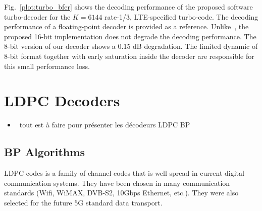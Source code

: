 Fig.~\ref{plot:turbo_bfer} shows the decoding performance of the proposed
software turbo-decoder for the $K = 6144$ rate-1/3, LTE-specified turbo-code.
The decoding performance of a floating-point decoder is provided as a reference.
Unlike~\cite{Wu2013}, the proposed 16-bit implementation does not degrade the
decoding performance. The 8-bit version of our decoder shows a 0.15 dB
degradation. The limited dynamic of 8-bit format together with early saturation
inside the decoder are responsible for this small performance loss.

\section{LDPC Decoders}

\begin{itemize}
  \item \xmark~tout est à faire pour présenter les décodeurs LDPC BP
\end{itemize}

\subsection{BP Algorithms}

LDPC codes is a family of channel codes that is well spread in current digital
communication systems. They have been chosen in many communication standards
(Wifi, WiMAX, DVB-S2, 10Gbps Ethernet, etc.). They were also selected for the
future 5G standard data transport.

